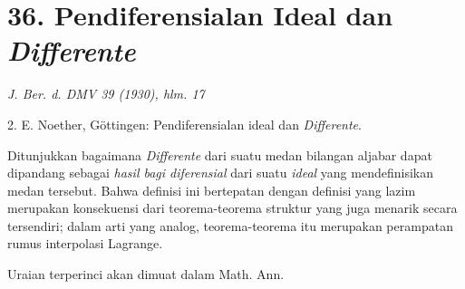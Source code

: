\documentclass[11pt]{article}
\begin{document}
\section*{36. Pendiferensialan Ideal dan \emph{Differente}}

\begin{center}
\emph{J. Ber. d. DMV 39 (1930), hlm. 17}
\end{center}

2. E. Noether, Göttingen: Pendiferensialan ideal dan \emph{Differente}.

Ditunjukkan bagaimana \emph{Differente} dari suatu medan bilangan aljabar dapat dipandang sebagai \emph{hasil bagi diferensial} dari suatu \emph{ideal} yang mendefinisikan medan tersebut. Bahwa definisi ini bertepatan dengan definisi yang lazim merupakan konsekuensi dari teorema-teorema struktur yang juga menarik secara tersendiri; dalam arti yang analog, teorema-teorema itu merupakan perampatan rumus interpolasi Lagrange.

Uraian terperinci akan dimuat dalam Math. Ann.
\end{document}

